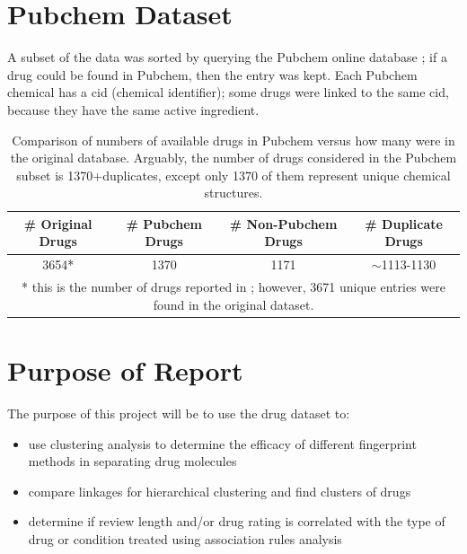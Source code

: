 \documentclass[11pt]{article}
\begin{document}
\section{Pubchem Dataset}

A subset of the data was sorted by querying the Pubchem online database \cite{pubchem}; if a drug could be found in Pubchem, then the entry was kept. Each Pubchem chemical has a cid (chemical identifier); some drugs were linked to the same cid, because they have the same active ingredient. 

\begin{table}[H]
    \centering
    \begin{tabular}{cccc}
    \toprule
\textbf{\# Original Drugs} & \textbf{\# Pubchem Drugs} & \textbf{\# Non-Pubchem Drugs} & \textbf{\# Duplicate Drugs} \\
\midrule
3654* & 1370 & 1171 & $\sim$1113-1130 \\
\bottomrule
\multicolumn{4}{c}{\footnotesize{* this is the number of drugs reported in \cite{paper-analysis}; however, 3671 unique entries were found in the original dataset.}}
    \end{tabular}
    \caption{Comparison of numbers of available drugs in Pubchem versus how many were in the original database. Arguably, the number of drugs considered in the Pubchem subset is 1370+duplicates, except only 1370 of them represent unique chemical structures.}
    \label{drugs-table}
\end{table}




\section{Purpose of Report}

The purpose of this project will be to use the drug dataset to:
\begin{itemize}
    \item use clustering analysis to determine the efficacy of different fingerprint methods in separating drug molecules
    \item compare linkages for hierarchical clustering and find clusters of drugs
    \item determine if review length and/or drug rating is correlated with the type of drug or condition treated using association rules analysis 
\end{itemize}
\end{document}
